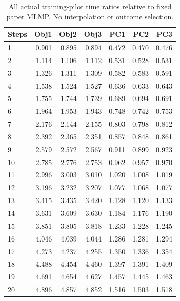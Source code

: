 \begin{table}[htbp]
\centering\scriptsize
\caption{All actual training-pilot time ratios relative to fixed paper MLMP. No interpolation or outcome selection.}
\label{tab:time-grid}
\setlength{\tabcolsep}{4pt}
\begin{tabular}{lrrrrrr}
\toprule
Steps & Obj1 & Obj2 & Obj3 & PC1 & PC2 & PC3 \\
\midrule
1 & 0.901 & 0.895 & 0.894 & 0.472 & 0.470 & 0.476 \\
2 & 1.114 & 1.106 & 1.112 & 0.531 & 0.528 & 0.531 \\
3 & 1.326 & 1.311 & 1.309 & 0.582 & 0.583 & 0.591 \\
4 & 1.538 & 1.524 & 1.527 & 0.636 & 0.633 & 0.643 \\
5 & 1.755 & 1.744 & 1.739 & 0.689 & 0.694 & 0.691 \\
6 & 1.964 & 1.953 & 1.943 & 0.748 & 0.742 & 0.753 \\
7 & 2.176 & 2.144 & 2.155 & 0.803 & 0.798 & 0.812 \\
8 & 2.392 & 2.365 & 2.351 & 0.857 & 0.848 & 0.861 \\
9 & 2.579 & 2.572 & 2.567 & 0.911 & 0.899 & 0.923 \\
10 & 2.785 & 2.776 & 2.753 & 0.962 & 0.957 & 0.970 \\
11 & 2.996 & 3.003 & 3.010 & 1.020 & 1.008 & 1.019 \\
12 & 3.196 & 3.232 & 3.207 & 1.077 & 1.068 & 1.077 \\
13 & 3.415 & 3.435 & 3.420 & 1.128 & 1.120 & 1.133 \\
14 & 3.631 & 3.609 & 3.630 & 1.184 & 1.176 & 1.190 \\
15 & 3.851 & 3.805 & 3.818 & 1.233 & 1.228 & 1.245 \\
16 & 4.046 & 4.039 & 4.044 & 1.286 & 1.281 & 1.294 \\
17 & 4.273 & 4.237 & 4.255 & 1.350 & 1.336 & 1.354 \\
18 & 4.488 & 4.454 & 4.460 & 1.397 & 1.391 & 1.409 \\
19 & 4.691 & 4.654 & 4.627 & 1.457 & 1.445 & 1.463 \\
20 & 4.896 & 4.857 & 4.852 & 1.516 & 1.503 & 1.518 \\
\bottomrule
\end{tabular}
\end{table}
